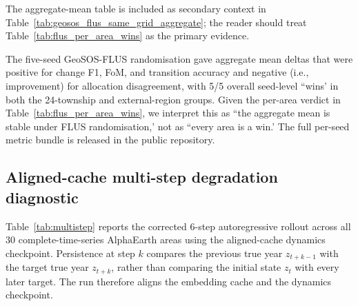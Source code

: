 \documentclass{article}
\begin{document}
The aggregate-mean table is included as secondary context in Table~\ref{tab:geosos_flus_same_grid_aggregate}; the reader should treat Table~\ref{tab:flus_per_area_wins} as the primary evidence.

\begin{table}[htbp]
\centering
\caption{Aggregate-mean same-grid comparison (secondary context only; the per-area paired-inference table above is the primary evidence). Township valid-pixel counts range from 3{,}176 to 37{,}126, so pixel-weighted aggregate means differ from unweighted per-area means.}
\label{tab:geosos_flus_same_grid_aggregate}
\scriptsize
{}
\end{table}

The five-seed GeoSOS-FLUS randomisation gave aggregate mean deltas that were positive for change F1, FoM, and transition accuracy and negative (i.e., improvement) for allocation disagreement, with 5/5 overall seed-level ``wins' in both the 24-township and external-region groups. Given the per-area verdict in Table~\ref{tab:flus_per_area_wins}, we interpret this as ``the aggregate mean is stable under FLUS randomisation,' not as ``every area is a win.' The full per-seed metric bundle is released in the public repository.

\subsection{Aligned-cache multi-step degradation diagnostic}

Table~\ref{tab:multistep} reports the corrected 6-step autoregressive rollout across all 30 complete-time-series AlphaEarth areas using the aligned-cache dynamics checkpoint. Persistence at step $k$ compares the previous true year $z_{t+k-1}$ with the target true year $z_{t+k}$, rather than comparing the initial state $z_t$ with every later target. The run therefore aligns the embedding cache and the dynamics checkpoint.
\end{document}
